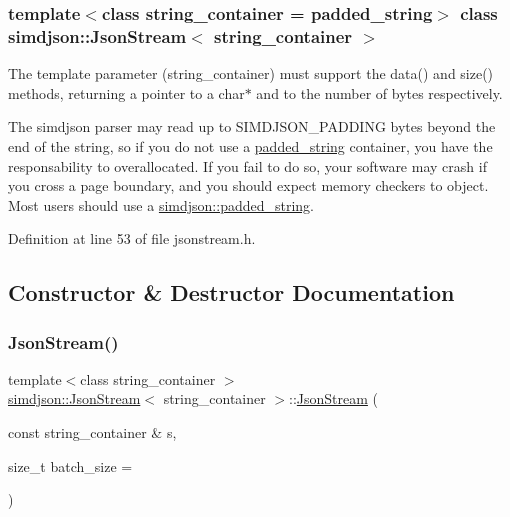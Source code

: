 \subsubsection*{template$<$class string\+\_\+container = padded\+\_\+string$>$\newline
class simdjson\+::\+Json\+Stream$<$ string\+\_\+container $>$}

The template parameter (string\+\_\+container) must support the data() and size() methods, returning a pointer to a char$\ast$ and to the number of bytes respectively. 

The simdjson parser may read up to S\+I\+M\+D\+J\+S\+O\+N\+\_\+\+P\+A\+D\+D\+I\+NG bytes beyond the end of the string, so if you do not use a \hyperlink{structsimdjson_1_1padded__string}{padded\+\_\+string} container, you have the responsability to overallocated. If you fail to do so, your software may crash if you cross a page boundary, and you should expect memory checkers to object. Most users should use a \hyperlink{structsimdjson_1_1padded__string}{simdjson\+::padded\+\_\+string}. 

Definition at line 53 of file jsonstream.\+h.



\subsection{Constructor \& Destructor Documentation}
\mbox{\label{classsimdjson_1_1_json_stream_ac7ab1f7dd9d839e155f32aa70ca3826d}} 
\subsubsection{\texorpdfstring{Json\+Stream()}{JsonStream()}}
{\footnotesize\ttfamily template$<$class string\+\_\+container $>$ \\
\hyperlink{classsimdjson_1_1_json_stream}{simdjson\+::\+Json\+Stream}$<$ string\+\_\+container $>$\+::\hyperlink{classsimdjson_1_1_json_stream}{Json\+Stream} (\begin{DoxyParamCaption}\item[{const string\+\_\+container \&}]{s,  }\item[{size\+\_\+t}]{batch\+\_\+size = {} }\end{DoxyParamCaption})}



